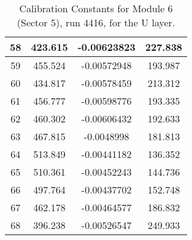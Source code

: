 \begin{table}[h]
{\begin{tabular}{|c|c|c|c|}
58	&	423.615	&	-0.00623823	&	227.838	\\	\hline
59	&	455.524	&	-0.00572948	&	193.987	\\	\hline
60	&	434.817	&	-0.00578459	&	213.312	\\	\hline
61	&	456.777	&	-0.00598776	&	193.335	\\	\hline
62	&	460.302	&	-0.00606432	&	192.633	\\	\hline
63	&	467.815	&	-0.0048998	&	181.813	\\	\hline
64	&	513.849	&	-0.00441182	&	136.352	\\	\hline
65	&	510.361	&	-0.00452243	&	144.736	\\	\hline
66	&	497.764	&	-0.00437702	&	152.748	\\	\hline
67	&	462.178	&	-0.00464577	&	186.832	\\	\hline
68	&	396.238	&	-0.00526547	&	249.933	\\	\hline
            \end{tabular}
        }
        \caption{Calibration Constants for Module 6 (Sector 5), run 4416, for the U layer.}
\end{table}


